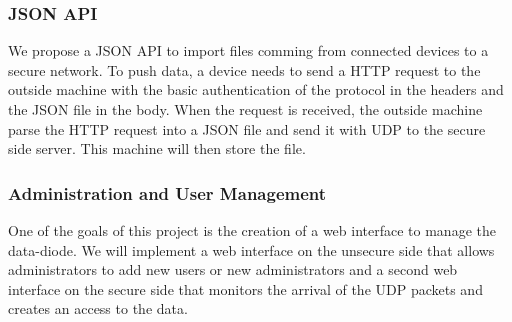 \documentclass[a4paper,11pt]{article}
\begin{document}
\subsubsection{JSON API}
We propose a JSON API to import files comming from connected devices to a secure network. To push data, a device needs to send a HTTP request to the outside machine with the basic authentication of the protocol in the headers and the JSON file in the body. When the request is received, the outside machine parse the HTTP request into a JSON file and send it with UDP to the secure side server. This machine will then store the file.

\subsubsection{Administration and User Management}
\label{sec:administration}
One of the goals of this project is the creation of a web interface to manage the data-diode. We will implement a web interface on the unsecure side that allows administrators to add new users or new administrators and a second web interface on the secure side that monitors the arrival of the UDP packets and creates an access to the data.
\end{document}

